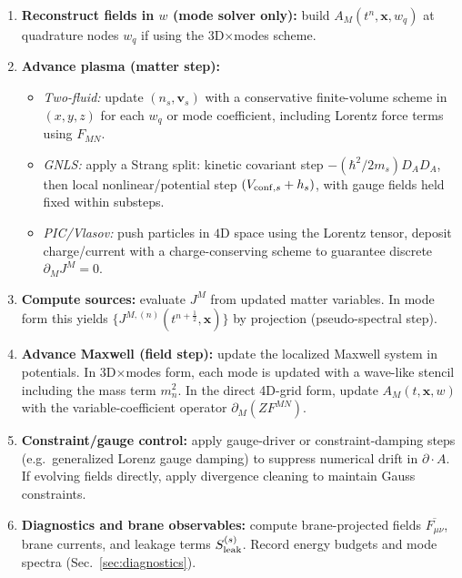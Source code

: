 \documentclass[11pt]{article}
\newcommand{\x}{\mathbf{x}}     %
\newcommand{\A}{A}              %
\newcommand{\F}{F}              %
\newcommand{\J}{J}              %
\newcommand{\Z}{Z}              %
\newcommand{\Proj}[1]{\overline{#1}} %
\newcommand{\Sleak}{S_{\rm leak}}
\begin{document}
\begin{enumerate}[leftmargin=1.6em]
\item \textbf{Reconstruct fields in \(w\) (mode solver only):}
build \(\A_M(t^n,\x,w_q)\) at quadrature nodes \(w_q\) if using the 3D\(\times\)modes scheme.

\item \textbf{Advance plasma (matter step):}
\begin{itemize}[leftmargin=1.7em]
\item \emph{Two-fluid:} update \((n_s,\mathbf{v}_s)\) with a conservative finite-volume
scheme in \((x,y,z)\) for each \(w_q\) or mode coefficient, including Lorentz force
terms using \(\F_{MN}\).
\item \emph{GNLS:} apply a Strang split: kinetic covariant step
\(-(\hbar^2/2m_s)D_A D_A\), then local nonlinear/potential step
\((V_{{\rm conf},s}+h_s)\), with gauge fields held fixed within substeps.
\item \emph{PIC/Vlasov:} push particles in \(4\)D space using the Lorentz tensor,
deposit charge/current with a charge-conserving scheme to guarantee discrete
\(\partial_M J^M=0\).
\end{itemize}

\item \textbf{Compute sources:}
evaluate \(\J^M\) from updated matter variables. In mode form this yields
\(\{J^{M,(n)}(t^{n+\frac12},\x)\}\) by projection (pseudo-spectral step).

\item \textbf{Advance Maxwell (field step):}
update the localized Maxwell system in potentials. In 3D\(\times\)modes form, each
mode is updated with a wave-like stencil including the mass term \(m_n^2\). In the
direct 4D-grid form, update \(\A_M(t,\x,w)\) with the variable-coefficient operator
\(\partial_M(\Z F^{MN})\).

\item \textbf{Constraint/gauge control:}
apply gauge-driver or constraint-damping steps (e.g.\ generalized Lorenz gauge
damping) to suppress numerical drift in \(\partial\!\cdot\!\A\). If evolving fields
directly, apply divergence cleaning to maintain Gauss constraints.

\item \textbf{Diagnostics and brane observables:}
compute brane-projected fields \(\Proj{F_{\mu\nu}}\), brane currents, and leakage
terms \(\Sleak^{(s)}\). Record energy budgets and mode spectra (Sec.~\ref{sec:diagnostics}).
\end{enumerate}
\end{document}
